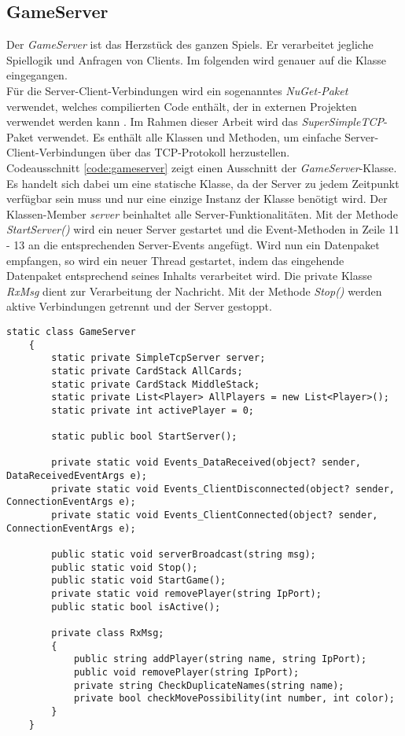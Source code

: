\subsection{GameServer}
Der \textit{GameServer} ist das Herzstück des ganzen Spiels. Er verarbeitet jegliche Spiellogik und Anfragen von Clients. Im folgenden wird genauer auf die Klasse eingegangen.\\
Für die Server-Client-Verbindungen wird ein sogenanntes \textit{NuGet-Paket} verwendet, welches compilierten Code enthält, der in externen Projekten verwendet werden kann \cite{NuGet}. Im Rahmen dieser Arbeit wird das \textit{SuperSimpleTCP}-Paket verwendet. Es enthält alle Klassen und Methoden, um einfache Server-Client-Verbindungen über das TCP-Protokoll herzustellen.\\
Codeausschnitt \ref{code:gameserver} zeigt einen Ausschnitt der \textit{GameServer}-Klasse. Es handelt sich dabei um eine statische Klasse, da der Server zu jedem Zeitpunkt verfügbar sein muss und nur eine einzige Instanz der Klasse benötigt wird. Der Klassen-Member \textit{server} beinhaltet alle Server-Funktionalitäten. Mit der Methode \textit{StartServer()} wird ein neuer Server gestartet und die Event-Methoden in Zeile 11 - 13 an die entsprechenden Server-Events angefügt. Wird nun ein Datenpaket empfangen, so wird ein neuer Thread gestartet, indem das eingehende Datenpaket entsprechend seines Inhalts verarbeitet wird. Die private Klasse \textit{RxMsg} dient zur Verarbeitung der Nachricht. Mit der Methode \textit{Stop()} werden aktive Verbindungen getrennt und der Server gestoppt.
\begin{lstlisting}[label={code:gameserver}, caption={Codeausschnitt Klasse \textit{GameServer}}]
	static class GameServer
	{
		static private SimpleTcpServer server;
		static private CardStack AllCards;
		static private CardStack MiddleStack;
		static private List<Player> AllPlayers = new List<Player>();
		static private int activePlayer = 0;
		
		static public bool StartServer();
		
		private static void Events_DataReceived(object? sender, DataReceivedEventArgs e);
		private static void Events_ClientDisconnected(object? sender, ConnectionEventArgs e);
		private static void Events_ClientConnected(object? sender, ConnectionEventArgs e);
		
		public static void serverBroadcast(string msg);
		public static void Stop();
		public static void StartGame();
		private static void removePlayer(string IpPort);
		public static bool isActive();
		
		private class RxMsg;
		{
			public string addPlayer(string name, string IpPort);
			public void removePlayer(string IpPort);
			private string CheckDuplicateNames(string name);
			private bool checkMovePossibility(int number, int color);
		}
	}
	
\end{lstlisting}
